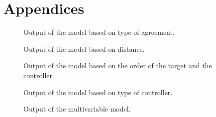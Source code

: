 \chapter*{Appendices}\label{chap:Appendices}



\begin{figure}[H]
\footnotesize
\typewriting{

}
\caption{Output of the model based on type of agreement.}
\end{figure}

\begin{figure}[H]
\footnotesize
\typewriting{

}
\caption{Output of the model based on distance.}
\end{figure}

\begin{figure}[H]
\footnotesize
\typewriting{

}
\caption{Output of the model based on the order of the target and the controller.}
\end{figure}

\begin{figure}[H]
\footnotesize
\typewriting{

}
\caption{Output of the model based on type of controller.}
\end{figure}

\begin{figure}[H]
\footnotesize
\typewriting{

}
\caption{Output of the multivariable model.}
\end{figure}
